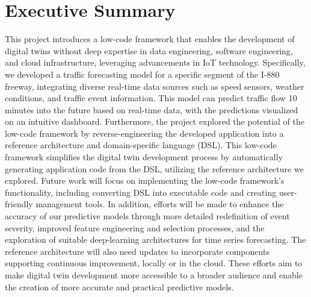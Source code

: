 \chapter{Executive Summary}
 This project introduces a low-code framework that enables the development of digital twins without deep expertise in data engineering, software engineering, and cloud infrastructure, leveraging advancements in IoT technology. Specifically, we developed a traffic forecasting model for a specific segment of the I-880 freeway, integrating diverse real-time data sources such as speed sensors, weather conditions, and traffic event information. This model can predict traffic flow 10 minutes into the future based on real-time data, with the predictions visualized on an intuitive dashboard. Furthermore, the project explored the potential of the low-code framework by reverse-engineering the developed application into a reference architecture and domain-specific language (DSL). This low-code framework simplifies the digital twin development process by automatically generating application code from the DSL, utilizing the reference architecture we explored. Future work will focus on implementing the low-code framework's functionality, including converting DSL into executable code and creating user-friendly management tools. In addition, efforts will be made to enhance the accuracy of our predictive models through more detailed redefinition of event severity, improved feature engineering and selection processes, and the exploration of suitable deep-learning architectures for time series forecasting. The reference architecture will also need updates to incorporate components supporting continuous improvement, locally or in the cloud. These efforts aim to make digital twin development more accessible to a broader audience and enable the creation of more accurate and practical predictive models.

